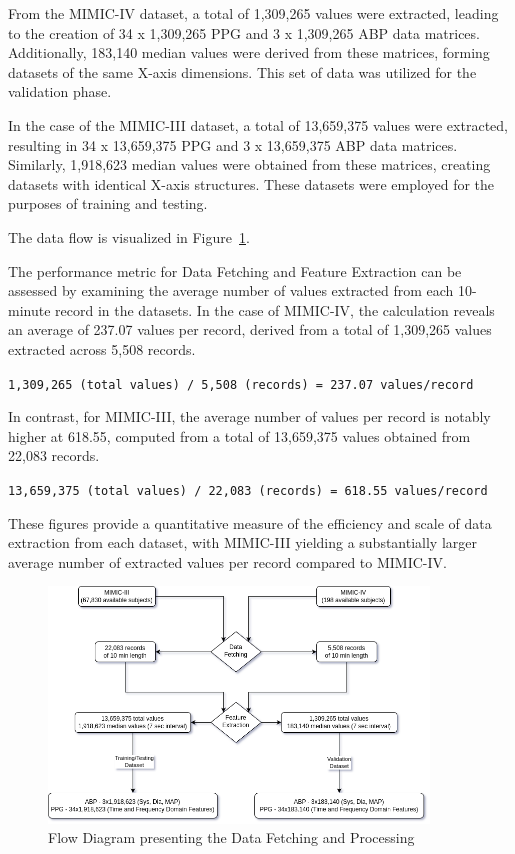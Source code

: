 From the MIMIC-IV dataset, a total of 1,309,265 values were extracted, leading to the creation of 34 x 1,309,265 PPG and 3 x 1,309,265 ABP data matrices.
Additionally, 183,140 median values were derived from these matrices, forming datasets of the same X-axis dimensions.
This set of data was utilized for the validation phase.

In the case of the MIMIC-III dataset, a total of 13,659,375 values were extracted, resulting in 34 x 13,659,375 PPG and 3 x 13,659,375 ABP data matrices.
Similarly, 1,918,623 median values were obtained from these matrices, creating datasets with identical X-axis structures.
These datasets were employed for the purposes of training and testing.

The data flow is visualized in Figure~\ref{fig:data_flow}.

The performance metric for Data Fetching and Feature Extraction can be assessed by examining the average number of values extracted from each 10-minute record in the datasets.
In the case of MIMIC-IV, the calculation reveals an average of 237.07 values per record, derived from a total of 1,309,265 values extracted across 5,508 records.

\vspace{0.3cm}
\texttt{1,309,265 (total values) / 5,508 (records) = 237.07 values/record}
\vspace{0.3cm}

In contrast, for MIMIC-III, the average number of values per record is notably higher at 618.55, computed from a total of 13,659,375 values obtained from 22,083 records.

\vspace{0.3cm}
\texttt{13,659,375 (total values) / 22,083 (records) = 618.55 values/record}
\vspace{0.3cm}

These figures provide a quantitative measure of the efficiency and scale of data extraction from each dataset, with MIMIC-III yielding a substantially larger average number of extracted values per record compared to MIMIC-IV\@.

\begin{figure}[h]
    \centering
    \includegraphics[width=0.9\textwidth]{images/results/flow_diagram}
    \caption{Flow Diagram presenting the Data Fetching and Processing}
    \label{fig:data_flow}
\end{figure}

